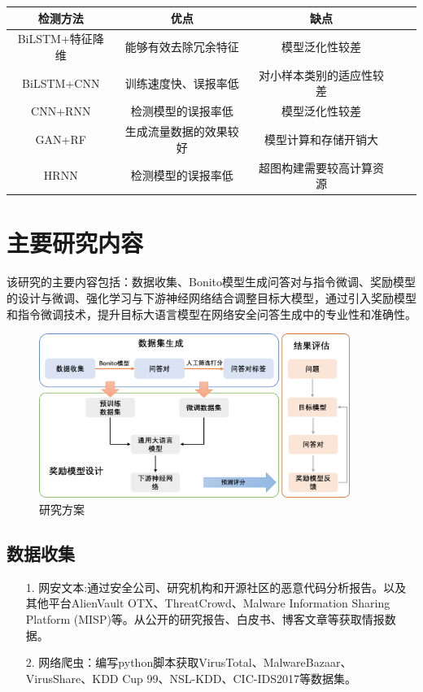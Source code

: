 \begin{table}[htbp]
    \vspace{0.5em}\centering\wuhao
    \begin{tabular}{ccccc}
        \toprule
        检测方法        & 优点          & 缺点           \\
        \midrule
        BiLSTM+特征降维 & 能够有效去除冗余特征  & 模型泛化性较差      \\
        BiLSTM+CNN  & 训练速度快、误报率低  & 对小样本类别的适应性较差 \\
        CNN+RNN     & 检测模型的误报率低   & 模型泛化性较差      \\
        GAN+RF      & 生成流量数据的效果较好 & 模型计算和存储开销大   \\
        HRNN        & 检测模型的误报率低   & 超图构建需要较高计算资源 \\
        \bottomrule
    \end{tabular}
\end{table}
\section{主要研究内容}
该研究的主要内容包括：数据收集、Bonito模型生成问答对与指令微调、奖励模型的设计与微调、强化学习与下游神经网络结合调整目标大模型，通过引入奖励模型和指令微调技术，提升目标大语言模型在网络安全问答生成中的专业性和准确性。
\begin{figure}[htbp]
    \centering
    \includegraphics[width=0.9\textwidth]{./img/liucheng.png}
    \caption{研究方案}\label{fig:研究方案}
\end{figure}
\subsection{数据收集}
\begin{itemize}
    \item[1.] 网安文本:通过安全公司、研究机构和开源社区的恶意代码分析报告。以及其他平台AlienVault OTX、ThreatCrowd、Malware Information Sharing Platform (MISP)等。从公开的研究报告、白皮书、博客文章等获取情报数据。
    \item[2.] 网络爬虫：编写python脚本获取VirusTotal、MalwareBazaar、VirusShare、KDD Cup 99、NSL-KDD、CIC-IDS2017等数据集。
\end{itemize}

